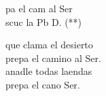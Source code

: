 \begin{cancion}%
	\begin{chorus}%
	pa el cam al Ser\\
	scuc la Pb  D. (**)\\
	\end{chorus}%
	 que clama el desierto\\
	prepa el camino al Ser.\\
	anadle todas laendas\\
	prepa el cano  Ser.\\
\end{cancion}%
